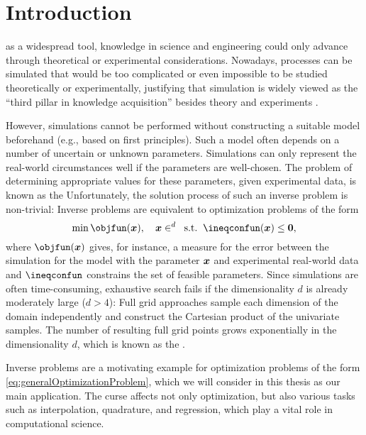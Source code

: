 
\chapter{Introduction}
\label{chap:10introduction}

as a widespread tool,
knowledge in science and engineering could only advance through
theoretical or experimental considerations.
Nowadays, processes can be simulated
that would be too complicated or even impossible
to be studied theoretically or experimentally,
justifying that simulation is widely viewed as the
``third pillar in knowledge acquisition''
besides theory and experiments \cite{Bungartz14Modeling}.

However, simulations cannot be performed without constructing
a suitable model beforehand (e.g., based on first principles).
Such a model often depends on a number of uncertain or unknown parameters.
Simulations can only represent the real-world circumstances well
if the parameters are well-chosen.
The problem of determining appropriate values for these parameters,
given experimental data, is known as the 
Unfortunately, the solution process of such an inverse problem is non-trivial:
Inverse problems are equivalent to optimization problems of the form
\begin{equation}
  \label{eq:generalOptimizationProblem}
  \min \objfun(\*x),\quad
  \*x \in \real^d\;\;\text{s.t.}\;\;
  \ineqconfun(\*x) \le \*0,
\end{equation}
where $\objfun(\*x)$ gives, for instance,
a measure for the error between the simulation for the model with
the parameter ${\boldsymbol{x}}$ and experimental real-world data and
$\ineqconfun$ constrains the set of feasible parameters.
Since simulations are often time-consuming,
exhaustive search fails
if the dimensionality $d$ is already moderately large ($d > 4$):
Full grid approaches sample each dimension of the domain
independently and construct the Cartesian product of the univariate
samples.
The number of resulting full grid points
grows exponentially in the dimensionality $d$,
which is known as the  \cite{Bellman61Adaptive}.

Inverse problems are a motivating example for optimization problems
of the form \eqref{eq:generalOptimizationProblem}, which we will consider in
this thesis as our main application.
The curse affects not only optimization,
but also various tasks such as interpolation, quadrature, and regression,
which play a vital role in computational science.

